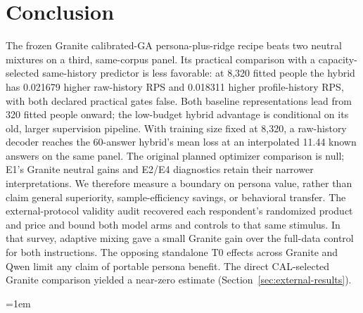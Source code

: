\documentclass[10pt,twocolumn]{article}
\begin{document}
\section{Conclusion}
The frozen Granite calibrated-GA persona-plus-ridge recipe beats two neutral
mixtures on a third, same-corpus panel. Its practical comparison with a
capacity-selected same-history predictor is less favorable: at 8,320 fitted
people the hybrid has 0.021679 higher raw-history RPS and 0.018311 higher
profile-history RPS, with both declared practical gates false. Both baseline
representations lead from 320 fitted people onward; the low-budget hybrid
advantage is conditional on its old, larger supervision pipeline. With
training size fixed at 8,320, a raw-history decoder reaches the 60-answer
hybrid's mean loss at an interpolated 11.44 known answers on the same panel. The
original planned optimizer comparison is null; E1's Granite neutral gains
and E2/E4 diagnostics retain their narrower interpretations. We therefore
measure a boundary on persona value, rather than claim general superiority,
sample-efficiency savings, or behavioral transfer. The external-protocol
validity audit recovered each respondent's randomized product and price and
bound both model arms and controls to that same stimulus. In that survey, adaptive mixing gave a small Granite gain over the full-data
control for both instructions. The opposing standalone T0 effects across
Granite and Qwen limit any claim of portable persona benefit. The direct
CAL-selected Granite comparison yielded a near-zero estimate
(Section~\ref{sec:external-results}).

\begingroup\emergencystretch=1em

{\raggedright}
\endgroup
\end{document}
